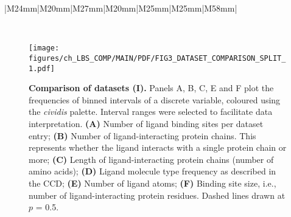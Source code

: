 \begin{landscape}
\begin{longtable}{|M{24mm}|M{20mm}|M{27mm}|M{20mm}|M{25mm}|M{25mm}|M{58mm}|}
\caption[Protein-ligand datasets summary statistics]{\textbf{Protein-ligand datasets summary statistics.} LIGYSIS is our reference dataset, LIGYSIS\textsubscript{NI} is a subset with no ion (NI) binding sites, sc-PDB\textsubscript{FULL}, bMOAD\textsubscript{SUB} and CHEN11 constitute training datasets, whereas PDBbind\textsubscript{REF}, SC6K, HOLO4K and COACH420 are test sets. \# Structures, \# Sites and \# Ligands represent the number of PDB structures, ligand sites and total number of ligands for each dataset. For LIGYSIS and LIGYSIS\textsubscript{NI}, 3,448 and 2,775, are the number of structural segments, each represented by a single chain. For each segment, biologically relevant ligands across structures were considered: $N$ = 23,321 (LIGYSIS) and $N$ = 19,012 (LIGYSIS\textsubscript{NI}). The number of ligands is not equal to the number of sites for LIGYSIS, as ligands from multiple structures of the same protein are aggregated into unique sites. Overlap (\%) is the percentage of protein-ligand complexes overlapping between these sets and LIGYSIS. Methods are the ligand site predictors that use these datasets for training or test. Only original versions of each dataset are considered in the analysis e.g., HOLO4K, but not HOLO4K\textsubscript{Mlig}, nor HOLO4K\textsubscript{Mlig+} HAP, or HAP-small. The same goes for Mlig and Mlig+ versions of COACH420, sc-PDB\textsubscript{SUB} and sc-PDB\textsubscript{RICH}. \textit{ALL*} represents all methods in this work except for fpocket, PocketFinder\textsuperscript{+}, Ligsite\textsuperscript{+} and Surfnet\textsuperscript{+}.}
\label{tab:datasets_comp}\\
\end{longtable}
\end{landscape}

\FloatBarrier

\begin{figure}[ht!]
    \centering
    \texttt{[image: figures/ch\_LBS\_COMP/MAIN/PDF/FIG3\_DATASET\_COMPARISON\_SPLIT\_1.pdf]}
    \caption[Comparison of datasets (I)]{\textbf{Comparison of datasets (I).} Panels A, B, C, E and F plot the frequencies of binned intervals of a discrete variable, coloured using the \textit{cividis} palette. Interval ranges were selected to facilitate data interpretation. \textbf{(A)} Number of ligand binding sites per dataset entry; \textbf{(B)} Number of ligand-interacting protein chains. This represents whether the ligand interacts with a single protein chain or more; \textbf{(C)} Length of ligand-interacting protein chains (number of amino acids); \textbf{(D)} Ligand molecule type frequency as described in the CCD; \textbf{(E)} Number of ligand atoms; \textbf{(F)} Binding site size, i.e., number of ligand-interacting protein residues. Dashed lines drawn at $p$ = 0.5.}
    \label{fig:dataset_comp_1}
\end{figure}

